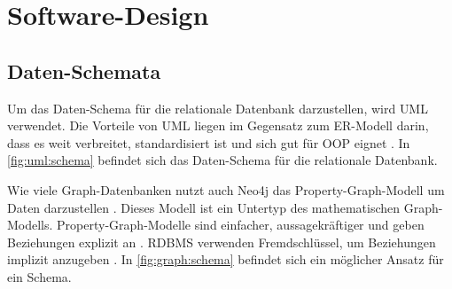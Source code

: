 \section{Software-Design}\label{ch:design}

\subsection{Daten-Schemata}
Um das Daten-Schema für die relationale Datenbank darzustellen, wird \ac{UML} verwendet. Die Vorteile von \ac{UML} liegen im Gegensatz zum \ac{ER-Modell} darin, dass es weit verbreitet, standardisiert ist und sich gut für \ac{OOP} eignet \cite{teorey2011database}. In \autoref{fig:uml:schema} befindet sich das Daten-Schema für die relationale Datenbank.

Wie viele Graph-Datenbanken nutzt auch Neo4j das Property-Graph-Modell um Daten darzustellen  \cite{lal2015neo4j}. Dieses Modell ist ein Untertyp des mathematischen Graph-Modells. Property-Graph-Modelle sind einfacher, aussagekräftiger und geben Beziehungen explizit an \cite{lal2015neo4j}. \ac{RDBMS} verwenden Fremdschlüssel, um Beziehungen implizit anzugeben \cite{lal2015neo4j}. In \autoref{fig:graph:schema} befindet sich ein möglicher Ansatz für ein Schema.

